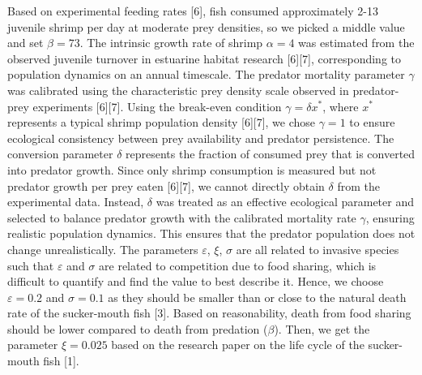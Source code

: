 \documentclass{article}
\begin{document}
\noindent Based on experimental feeding rates [6], fish consumed approximately 2-13 juvenile shrimp per day at moderate prey densities, so we picked a middle value and set $\beta = 73$. The intrinsic growth rate of shrimp $\alpha = 4$ was estimated from the observed juvenile turnover in estuarine habitat research [6][7], corresponding to population dynamics on an annual timescale. The predator mortality parameter $\gamma$ was calibrated using the characteristic prey density scale observed in predator-prey experiments [6][7]. Using the break-even condition $\gamma = \delta x^*$, where $x^*$ represents a typical shrimp population density [6][7], we chose $\gamma = 1$ to ensure ecological consistency between prey availability and predator persistence. The conversion parameter $\delta$ represents the fraction of consumed prey that is converted into predator growth. Since only shrimp consumption is measured but not predator growth per prey eaten [6][7], we cannot directly obtain $\delta$ from the experimental data. Instead, $\delta$ was treated as an effective ecological parameter and selected to balance predator growth with the calibrated mortality rate $\gamma$, ensuring realistic population dynamics. This ensures that the predator population does not change unrealistically. The parameters $\varepsilon$, $\xi$, $\sigma$ are all related to invasive species such that $\varepsilon$ and $\sigma$ are related to competition due to food sharing, which is difficult to quantify and find the value to best describe it. Hence, we choose $\varepsilon = 0.2$ and $\sigma = 0.1$ as they should be smaller than or close to the natural death rate of the sucker-mouth fish [3]. Based on reasonability, death from food sharing should be lower compared to death from predation ($\beta$). Then, we get the parameter $\xi = 0.025$ based on the research paper on the life cycle of the sucker-mouth fish [1].

\vspace{5mm}
\end{document}

